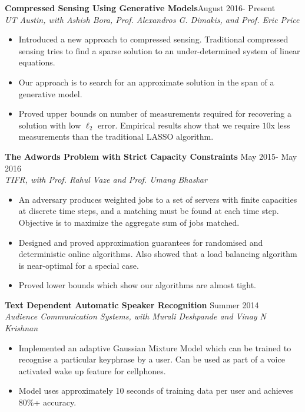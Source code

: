 \documentclass[margin, 11pt]{res} %
\begin{document}
\begin{resume}
{\bf Compressed Sensing Using Generative Models}\hfill August 2016- Present\\
{\sl UT Austin, with Ashish Bora, Prof. Alexandros G. Dimakis, and Prof. Eric Price}
\begin{itemize}\itemsep -2pt
	\item Introduced a new approach to compressed sensing. Traditional compressed sensing tries to find a sparse solution to an under-determined system of linear equations.
	\item Our approach is to search for an approximate solution in the span of a generative model.
	\item Proved upper bounds on number of measurements required for recovering a solution with low $\ell_2$ error. Empirical results show that we require $10$x less measurements than the traditional LASSO algorithm.
\end{itemize}

{\bf The Adwords Problem with Strict Capacity Constraints} \hfill May 2015- May 2016\\
{\sl TIFR, with Prof. Rahul Vaze and Prof. Umang Bhaskar}
\begin{itemize}\itemsep -2pt
	\item An adversary produces weighted jobs to a set of servers with finite capacities at discrete	time steps, and a matching must be found at each time step. Objective is to maximize the aggregate sum of jobs matched.
	\item Designed and proved approximation guarantees for randomised and deterministic online algorithms. Also showed that a load balancing algorithm is near-optimal for a special case.
	\item Proved lower bounds which show our algorithms are almost tight.
\end{itemize}

{\bf Text Dependent Automatic Speaker Recognition} \hfill Summer 2014\\
{\sl Audience Communication Systems, with Murali Deshpande and Vinay N Krishnan}
\begin{itemize}\itemsep -2pt
\item Implemented an adaptive Gaussian Mixture Model which can be trained to recognise a particular
keyphrase by a 	user. Can be used as part of a voice activated wake up feature for
cellphones.
\item Model uses approximately 10 seconds of training data per user and achieves 80\%+ accuracy.
\end{itemize}


\end{resume}
\end{document}

